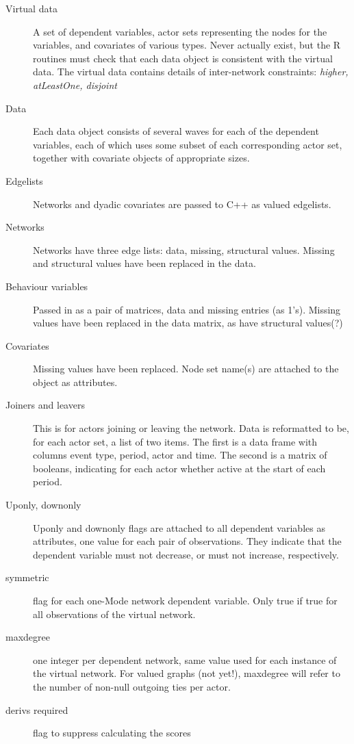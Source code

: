 \documentclass[12pt,a4paper]{article}
\renewcommand{\=}{\,=\,}
\newcommand{\+}{\,+\,}
\newcommand{\nnm}[1]{\textsf{\small\textit{#1}}}
\newcommand{\R}{{\sf R }}
\begin{document}
\begin{description}
\item [Virtual data] A set of dependent variables, actor sets representing the
  nodes for the variables, and covariates of various types. Never actually
  exist, but the \R routines must check that each data object is consistent with
  the virtual data. The virtual data contains details of inter-network
  constraints: \nnm{higher, atLeastOne, disjoint}
\item[Data] Each data object consists of several waves for each of the dependent
  variables, each of which uses some subset of each corresponding actor set,
  together with covariate objects of appropriate sizes.
\item[Edgelists] Networks and dyadic covariates are passed to C++ as valued
  edgelists.
\item [Networks] Networks have three edge lists: data, missing, structural
  values. Missing and structural values have been replaced in the data.
\item[Behaviour variables] Passed in as a pair of matrices, data and missing
  entries (as 1's). Missing values have been replaced in the data matrix, as
  have structural values(?)
\item [Covariates] Missing values have been replaced. Node set name(s) are
  attached to the object as attributes.
\item[Joiners and leavers] This is for actors joining or leaving the network.
  Data is reformatted to be, for each actor set, a list
  of two items. The first is a data frame with columns event type, period, actor
  and time. The second is a matrix of booleans, indicating for each actor
  whether active at the start of each period.
\item[Uponly, downonly] Uponly and downonly flags are attached to all dependent
  variables as attributes, one value for each pair of observations.
  They indicate that the dependent variable must not decrease, or must not
  increase, respectively.
\item[symmetric] flag for each one-Mode network dependent variable. Only true if
  true for all observations of the virtual network.
\item[maxdegree] one integer per dependent network, same value used for each
  instance of the virtual network.  For valued graphs (not yet!), maxdegree will
  refer to the number of non-null outgoing ties per actor.
\item[derivs required] flag to suppress calculating the scores

\end{description}
\end{document}
